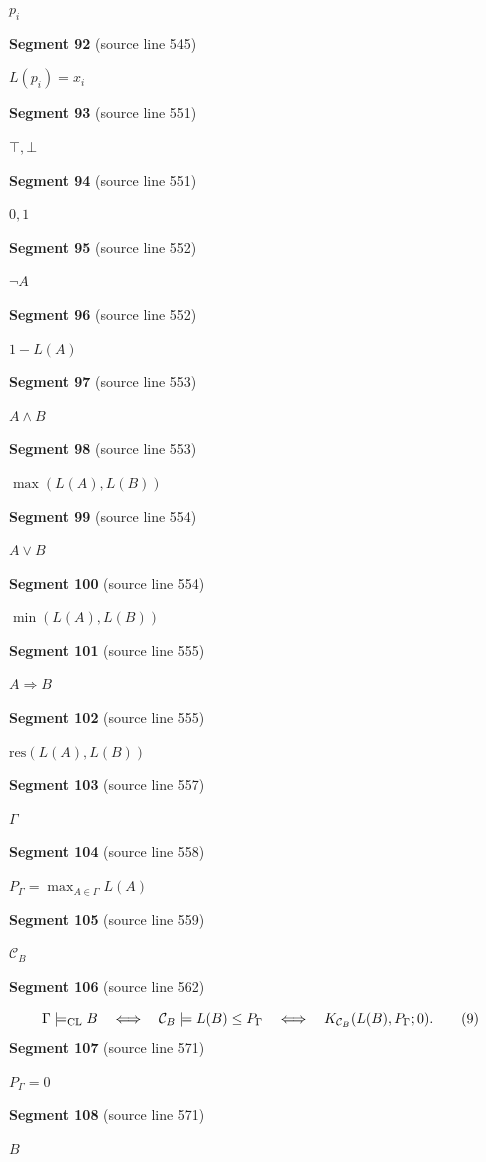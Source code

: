 \documentclass[11pt]{article}
\begin{document}
\( p_i \)\par
\textbf{Segment 92} (source line 545)\par
\( L(p_i)=x_i \)\par
\textbf{Segment 93} (source line 551)\par
\( \top,\bot \)\par
\textbf{Segment 94} (source line 551)\par
\( 0,1 \)\par
\textbf{Segment 95} (source line 552)\par
\( \neg A \)\par
\textbf{Segment 96} (source line 552)\par
\( 1-L(A) \)\par
\textbf{Segment 97} (source line 553)\par
\( A\land B \)\par
\textbf{Segment 98} (source line 553)\par
\( \max(L(A),L(B)) \)\par
\textbf{Segment 99} (source line 554)\par
\( A\lor B \)\par
\textbf{Segment 100} (source line 554)\par
\( \min(L(A),L(B)) \)\par
\textbf{Segment 101} (source line 555)\par
\( A\Rightarrow B \)\par
\textbf{Segment 102} (source line 555)\par
\( \mathrm{res}(L(A),L(B)) \)\par
\textbf{Segment 103} (source line 557)\par
\( \Gamma \)\par
\textbf{Segment 104} (source line 558)\par
\( P_\Gamma=\max_{A\in\Gamma}L(A) \)\par
\textbf{Segment 105} (source line 559)\par
\( \mathcal C_B \)\par
\textbf{Segment 106} (source line 562)\par
\[
\Gamma\models_{\rm CL}B
\quad\Longleftrightarrow\quad
\mathcal C_B\models L(B)\le P_\Gamma
\quad\Longleftrightarrow\quad
K_{\mathcal C_B}(L(B),P_\Gamma;0).
\tag{9}
\]
\textbf{Segment 107} (source line 571)\par
\( P_\Gamma=0 \)\par
\textbf{Segment 108} (source line 571)\par
\( B \)\par
\end{document}

